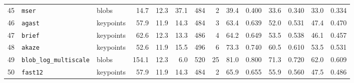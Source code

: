 \begin{landscape}
\begin{longtable}{@{}r >{\raggedright\arraybackslash\ttfamily}p{2.8cm} >{\raggedright\arraybackslash}p{1.7cm} r r r r r r r r r r r@{}}
45 & \texttt{mser} & blobs & 14.7 & 12.3 & 37.1 & 484 & 2 & 39.4 & 0.400 & 33.6 & 0.340 & 33.0 & 0.334 \\
46 & \texttt{agast} & keypoints & 57.9 & 11.9 & 14.3 & 484 & 3 & 63.4 & 0.639 & 52.0 & 0.531 & 47.4 & 0.470 \\
47 & \texttt{brief} & keypoints & 62.6 & 12.3 & 13.3 & 486 & 4 & 64.2 & 0.649 & 53.5 & 0.538 & 46.1 & 0.457 \\
48 & \texttt{akaze} & keypoints & 52.6 & 11.9 & 15.5 & 496 & 6 & 73.3 & 0.740 & 60.5 & 0.610 & 53.5 & 0.531 \\
49 & \texttt{blob\_log\_multiscale} & blobs & 154.1 & 12.3 & 6.0 & 520 & 25 & 81.0 & 0.800 & 71.3 & 0.720 & 62.0 & 0.609 \\
50 & \texttt{fast12} & keypoints & 57.9 & 11.9 & 14.3 & 484 & 2 & 65.9 & 0.655 & 55.9 & 0.560 & 47.5 & 0.486 \\
\end{longtable}


\end{landscape}
